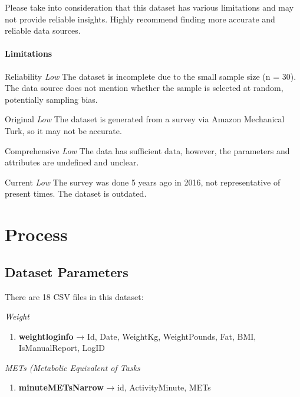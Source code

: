 \documentclass[
]{article}
\providecommand{\tightlist}{%
  \setlength{\itemsep}{0pt}\setlength{\parskip}{0pt}}
\begin{document}
Please take into consideration that this dataset has various limitations
and may not provide reliable insights. Highly recommend finding more
accurate and reliable data sources.

\hypertarget{limitations}{%
\paragraph{Limitations}\label{limitations}}

{Reliability} \textbar{} \emph{Low} \textbar{} The dataset is incomplete
due to the small sample size (n = 30). The data source does not mention
whether the sample is selected at random, potentially sampling bias.

{Original} \textbar{} \emph{Low} \textbar{} The dataset is generated
from a survey via Amazon Mechanical Turk, so it may not be accurate.

{Comprehensive} \textbar{} \emph{Low} \textbar{} The data has sufficient
data, however, the parameters and attributes are undefined and unclear.

{Current} \textbar{} \emph{Low} \textbar{} The survey was done 5 years
ago in 2016, not representative of present times. The dataset is
outdated.

\hypertarget{process}{%
\section{Process}\label{process}}

\hypertarget{dataset-parameters}{%
\subsection{Dataset Parameters}\label{dataset-parameters}}

There are 18 CSV files in this dataset:

\emph{{Weight}}

\begin{enumerate}
\def\labelenumi{\arabic{enumi}.}
\tightlist
\item
  \textbf{weightloginfo} → Id, Date, WeightKg, WeightPounds, Fat, BMI,
  IsManualReport, LogID
\end{enumerate}

\emph{{METs (Metabolic Equivalent of Tasks}}

\begin{enumerate}
\def\labelenumi{\arabic{enumi}.}
\setcounter{enumi}{1}
\tightlist
\item
  \textbf{minuteMETsNarrow} → id, ActivityMinute, METs
\end{enumerate}
\end{document}
